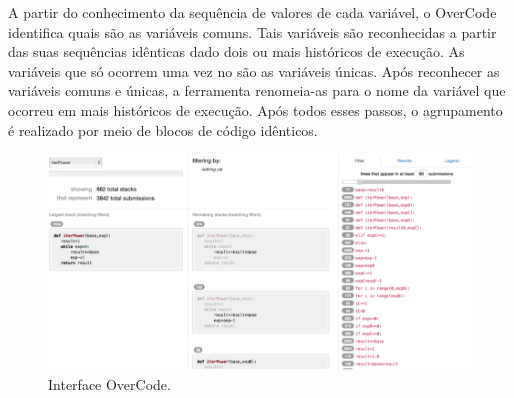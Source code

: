 	    A partir do conhecimento da sequência de valores de cada variável, o OverCode
	    identifica quais são as variáveis comuns. Tais variáveis são reconhecidas a
	    partir das suas sequências idênticas dado dois ou mais históricos de execução.
	    As variáveis que só ocorrem uma vez no  são as variáveis únicas.
	    Após reconhecer as variáveis comuns e únicas, a ferramenta renomeia-as para o
	    nome da variável que ocorreu em mais históricos de execução. Após todos esses
	    passos, o agrupamento é realizado por meio de blocos de código idênticos.
	    
%	    
	    
	    \begin{figure}[ht]
	        \centering
	        \includegraphics[scale=0.4]{imagem/overCode.png}
	        \captionsetup{justification=centering}
	        \caption{Interface OverCode.}
	        \label{fig:interfaceOverCode}
	    \end{figure}
	    
